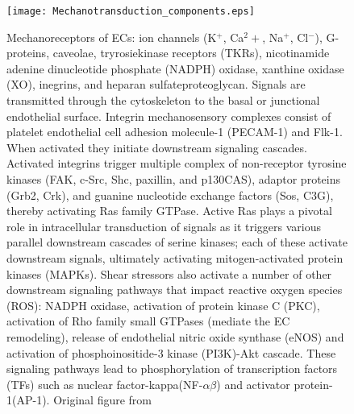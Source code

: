 \begin{figure}[!h]
  \begin{center}
    \texttt{[image: Mechanotransduction\_components.eps]}
  \end{center}
  \caption{Mechanoreceptors of ECs: ion channels (K$^+$, Ca$^2+$, Na$^+$, Cl$^-$), G-proteins, caveolae, tryrosiekinase receptors (TKRs), nicotinamide adenine dinucleotide phosphate (NADPH) oxidase, xanthine oxidase (XO), inegrins, and heparan sulfateproteoglycan. Signals are transmitted through the cytoskeleton to the basal or junctional endothelial surface. Integrin mechanosensory complexes consist of platelet endothelial cell adhesion molecule-1 (PECAM-1) and Flk-1. When activated they initiate downstream signaling cascades. Activated integrins trigger multiple complex of non-receptor tyrosine kinases (FAK, c-Src, Shc, paxillin, and p130CAS), adaptor proteins (Grb2, Crk), and guanine nucleotide exchange factors (Sos, C3G), thereby activating Ras family GTPase. Active Ras plays a pivotal role in intracellular transduction of signals as it triggers various parallel downstream cascades of serine kinases; each of these activate downstream signals, ultimately activating mitogen-activated protein kinases (MAPKs). Shear stressors also activate a number of other downstream signaling pathways that impact reactive oxygen species (ROS): NADPH oxidase, activation of protein kinase C (PKC), activation of Rho family small GTPases (mediate the EC remodeling), release of endothelial nitric oxide synthase (eNOS) and activation of phosphoinositide-3 kinase (PI3K)-Akt cascade. These signaling pathways lead to phosphorylation of transcription factors (TFs) such as nuclear factor-kappa(NF-$\alpha\beta$) and activator protein-1(AP-1). Original figure from\cite{CHATZIZISIS20072379}} 
   \label{Mechanotransducers}
\end{figure}


